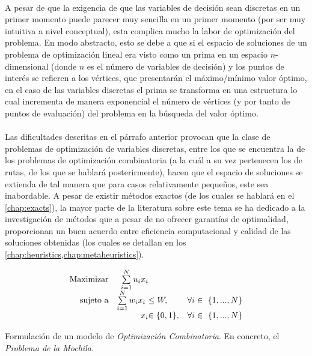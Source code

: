\documentclass{subfiles}
\begin{document}
        \paragraph{}
        A pesar de que la exigencia de que las variables de decisión sean discretas en un primer momento puede parecer muy sencilla en un primer momento (por ser muy intuitiva a nivel conceptual), esta complica mucho la labor de optimización del problema. En modo abstracto, esto se debe a que si el espacio de soluciones de un problema de optimización lineal era visto como un prima en un espacio $n$-dimensional (donde $n$ es el número de variables de decisión) y los puntos de interés se refieren a los vértices, que presentarán el máximo/mínimo valor óptimo, en el caso de las variables discretas el prima se transforma en una estructura  lo cual incrementa de manera exponencial el número de vértices (y por tanto de puntos de evaluación) del problema en la búsqueda del valor óptimo.

        \paragraph{}
        Las dificultades descritas en el párrafo anterior provocan que la clase de problemas de optimización de variables discretas, entre los que se encuentra la de los problemas de optimización combinatoria (a la cuál a su vez pertenecen los de rutas, de los que se hablará posterirmente), hacen que el espacio de soluciones se extienda de tal manera que para casos relativamente pequeños, este sea inabordable. A pesar de existir métodos exactos (de los cuales se hablará en el \cref{chap:exacts}), la mayor parte de la literatura sobre este tema se ha dedicado a la investigación de métodos que a pesar de no ofrecer garantías de optimalidad, proporcionan un buen acuerdo entre eficiencia computacional y calidad de las soluciones obtenidas (los cuales se detallan en los \cref{chap:heuristics,chap:metaheuristics}).

        \begin{eqfloat}
          \begin{equation}
            \begin{array}{rr@{}ll}
              \text{Maximizar} & \sum\limits_{i = 1}^{N} u_{i}x_{i} &                 & \\
              \text{sujeto a}	 & \sum\limits_{i = 1}^{N} w_{i}x_{i} \ &\leq W, & \forall i \in \{1,...,N\} \\
                               &                             	x_{i} 	&\in \{0, 1\}, 	                 & \forall i \in \{1,...,N\}
            \end{array}
          \end{equation}
          \caption{Formulación de un modelo de \emph{Optimización Combinatoria}. En concreto, el \emph{Problema de la Mochila}.}
          \label{eq:combinatorial_optimization_formulation}
        \end{eqfloat}
\end{document}
